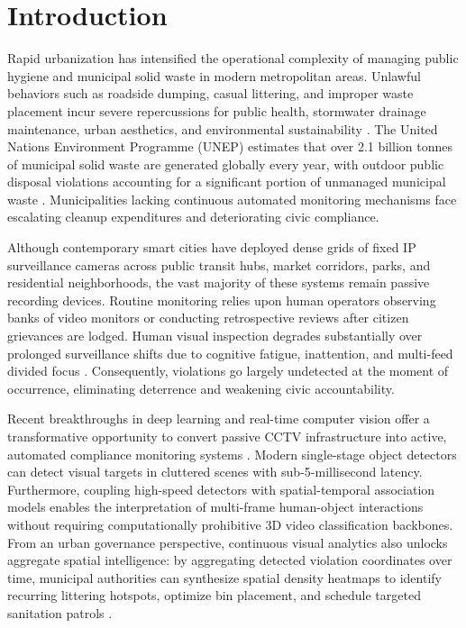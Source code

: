 \documentclass[conference]{IEEEtran}
\begin{document}
\section{Introduction}
\label{sec:intro}

Rapid urbanization has intensified the operational complexity of managing public hygiene and municipal solid waste in modern metropolitan areas. Unlawful behaviors such as roadside dumping, casual littering, and improper waste placement incur severe repercussions for public health, stormwater drainage maintenance, urban aesthetics, and environmental sustainability \cite{b1}. The United Nations Environment Programme (UNEP) estimates that over 2.1 billion tonnes of municipal solid waste are generated globally every year, with outdoor public disposal violations accounting for a significant portion of unmanaged municipal waste \cite{b2}. Municipalities lacking continuous automated monitoring mechanisms face escalating cleanup expenditures and deteriorating civic compliance.

Although contemporary smart cities have deployed dense grids of fixed IP surveillance cameras across public transit hubs, market corridors, parks, and residential neighborhoods, the vast majority of these systems remain passive recording devices. Routine monitoring relies upon human operators observing banks of video monitors or conducting retrospective reviews after citizen grievances are lodged. Human visual inspection degrades substantially over prolonged surveillance shifts due to cognitive fatigue, inattention, and multi-feed divided focus \cite{b11}. Consequently, violations go largely undetected at the moment of occurrence, eliminating deterrence and weakening civic accountability.

Recent breakthroughs in deep learning and real-time computer vision offer a transformative opportunity to convert passive CCTV infrastructure into active, automated compliance monitoring systems \cite{b4, b12}. Modern single-stage object detectors can detect visual targets in cluttered scenes with sub-5-millisecond latency. Furthermore, coupling high-speed detectors with spatial-temporal association models enables the interpretation of multi-frame human-object interactions without requiring computationally prohibitive 3D video classification backbones. From an urban governance perspective, continuous visual analytics also unlocks aggregate spatial intelligence: by aggregating detected violation coordinates over time, municipal authorities can synthesize spatial density heatmaps to identify recurring littering hotspots, optimize bin placement, and schedule targeted sanitation patrols \cite{b13}.
\end{document}
